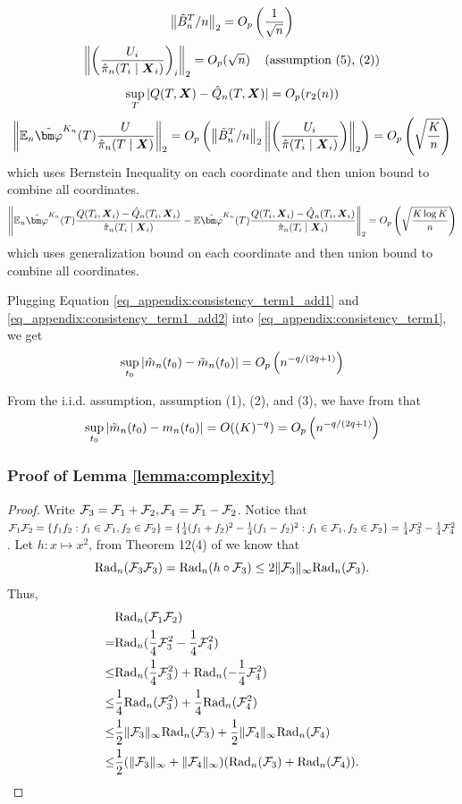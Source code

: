 $$\left\|\tilde{B}_n^T/n\right\|_2=O_p\left(\frac{1}{\sqrt{n}}\right)$$ 
$$\left\|\left(\frac{U_i}{\hat{\pi}_n(T_i\mid\boldsymbol{X}_i)}\right)_i\right\|_2=O_p(\sqrt{n})\quad\left(\text{assumption (5), (2)}\right)$$
$$\sup_{T}|Q(T,\boldsymbol{X})-\hat{Q}_n(T,\boldsymbol{X})|=O_p(r_2(n))$$ 
$$\left\|\E_n\tildevpk(T)\frac{U}{\hpin(T\mid\X)}\right\|_2
=\O_p\left(\left\|\tilde B_n^T/n\right\|_2\left\|\left(\frac{U_i}{\hat\pi(T_i\mid\X_i)}\right)\right\|_2\right)
=\O_p\left(\sqrt{\frac{K}{n}}\right)$$ 
which uses Bernstein Inequality on each coordinate and then union bound to combine all coordinates.
$$\left\|\E_n\tildevpk(T)\frac{Q(T_i,\X_i)-\hqn(T_i,\X_i)}{\hpin(T_i\mid\X_i)}-\E\tildevpk(T)\frac{Q(T_i,\X_i)-\hqn(T_i,\X_i)}{\hpin(T_i\mid\X_i)}\right\|_2=\O_p\left(\sqrt{\frac{K\log K}{n}}\right)$$ 
which uses generalization bound on each coordinate and then union bound to combine all coordinates.

Plugging Equation \eqref{eq_appendix:consistency_term1_add1} and \eqref{eq_appendix:consistency_term1_add2} into \eqref{eq_appendix:consistency_term1}, we get
$$
\sup_{t_0}\left|\hat m_n(t_0)-\tilde m_n(t_0)\right|
=O_p\left(n^{-q/(2q+1)}\right)
$$

From the i.i.d. assumption, assumption (1), (2), and (3), we have from \cite{devore1993constructive} that 
$$\sup_{t_0}\left|\tilde m_n(t_0)-m_n(t_0)\right|
=O((K)^{-q})
=O_p\left(n^{-q/(2q+1)}\right)$$ 
\fi

\subsubsection{Proof of Lemma \ref{lemma:complexity}}
\begin{proof}
Write $\mathcal{F}_3=\mathcal{F}_1+\mathcal{F}_2, \mathcal{F}_4=\mathcal{F}_1-\mathcal{F}_2$. Notice that
$\mathcal{F}_1\mathcal{F}_2=\{f_1f_2:f_1\in\mathcal{F}_1,f_2\in\mathcal{F}_2\}=\{\frac{1}{4}(f_1+f_2)^2-\frac{1}{4}(f_1-f_2)^2:f_1\in\mathcal{F}_1,f_2\in\mathcal{F}_2\}=\frac{1}{4}\mathcal{F}_3^2-\frac{1}{4}\mathcal{F}_4^2$. Let $h:x\mapsto x^2$, from Theorem 12(4) of \cite{bartlett2002rademacher} we know that
$$
\text{Rad}_n(\mathcal{F}_3\mathcal{F}_3)=
\text{Rad}_n(h\circ\mathcal{F}_3)
\leq
2\|\mathcal{F}_3\|_{\infty}\text{Rad}_n(\mathcal{F}_3).
$$
Thus,
\begin{equation*}
\begin{split}
&\text{Rad}_n(\mathcal{F}_1\mathcal{F}_2)
\\=&\text{Rad}_n(\frac{1}{4}\mathcal{F}_3^2-\frac{1}{4}\mathcal{F}_4^2)
\\\leq&\text{Rad}_n(\frac{1}{4}\mathcal{F}_3^2)+\text{Rad}_n(-\frac{1}{4}\mathcal{F}_4^2)
\\\leq&\frac{1}{4}\text{Rad}_n(\mathcal{F}_3^2)+\frac{1}{4}\text{Rad}_n(\mathcal{F}_4^2)
\\\leq&\frac{1}{2}\|\mathcal{F}_3\|_{\infty}\text{Rad}_n(\mathcal{F}_3)+\frac{1}{2}\|\mathcal{F}_4\|_{\infty}\text{Rad}_n(\mathcal{F}_4)
\\\leq&\frac{1}{2}(\|\mathcal{F}_3\|_{\infty}+\|\mathcal{F}_4\|_{\infty})(\text{Rad}_n(\mathcal{F}_3)+\text{Rad}_n(\mathcal{F}_4)).
\end{split}
\end{equation*}
\end{proof}







